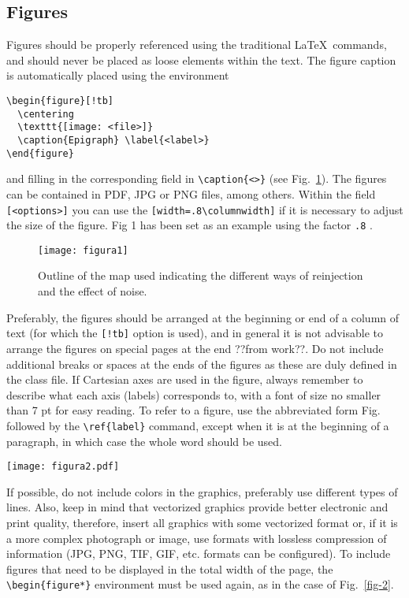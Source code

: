 \documentclass[eng]{ajceam-class}
\begin{document}
\subsection{Figures}

Figures should be properly referenced using the traditional \LaTeX\ commands, and should never be placed as loose elements within the text. The figure caption is automatically placed using the environment
\begin{verbatim}
\begin{figure}[!tb]
  \centering
  \texttt{[image: <file>]}
  \caption{Epigraph} \label{<label>}
\end{figure}
\end{verbatim}
and filling in the corresponding field in \verb!\caption{<>}! (see Fig.~\ref{fig-1}). The figures can be contained in PDF, JPG or PNG files, among others. Within the field \verb![<options>]! you can use the \verb![width=.8\columnwidth]! if it is necessary to adjust the size of the figure. Fig 1 has been set as an example using the factor \verb!.8! .

\begin{figure}[!tb] 
 \centering
 \texttt{[image: figura1]} 
 \caption{Outline of the map used indicating the different ways of reinjection and the effect of noise.} \label{fig-1}
\end{figure}

Preferably, the figures should be arranged at the beginning or end of a column of text (for which the \texttt{[!tb]} option is used), and in general it is not advisable to arrange the figures on special pages at the end ??from work??. Do not include additional breaks or spaces at the ends of the figures as these are duly defined in the class file. If Cartesian axes are used in the figure, always remember to describe what each axis (labels) corresponds to, with a font of size no smaller than 7 pt for easy reading. To refer to a figure, use the abbreviated form Fig. followed by the \verb!\ref{label}! command, except when it is at the beginning of a paragraph, in which case the whole word should be used.

\begin{figure*}[!tb] 
 \centering
 \texttt{[image: figura2.pdf]} 
 \caption{Example of the aliasing that occurs in a grid with $N = 8$ nodes. Both modes ($k = 2$ and $k = 10$) take the same values at the grid points.} \label{fig-2}
\end{figure*}

If possible, do not include colors in the graphics, preferably use different types of lines. Also, keep in mind that vectorized graphics provide better electronic and print quality, therefore, insert all graphics with some vectorized format or, if it is a more complex photograph or image, use formats with lossless compression of information (JPG, PNG, TIF, GIF, etc. formats can be configured). To include figures that need to be displayed in the total width of the page, the \verb!\begin{figure*}! environment must be used again, as in the case of Fig.~\ref{fig-2}.
\end{document}
